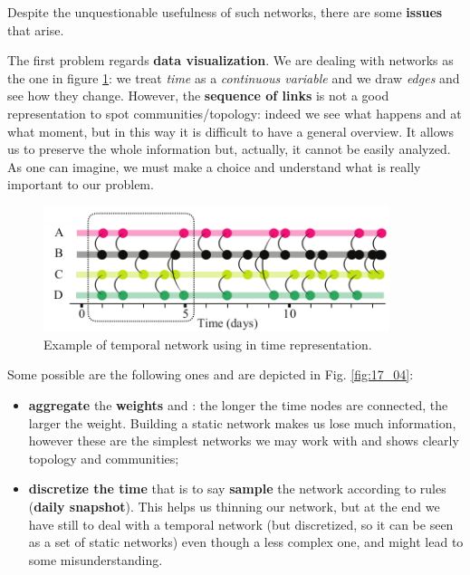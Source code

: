 \documentclass[../main/main.tex]{subfiles}
\begin{document}
Despite the unquestionable usefulness of such networks, there are some \textbf{issues} that arise.

The first problem regards \textbf{data visualization}. We are dealing with networks as the one in figure \ref{fig:17_03}: we treat \textit{time} as a \textit{continuous variable} and we draw \textit{edges} and see how they change. However, the \textbf{sequence of links} is not a good representation to spot communities/topology: indeed we see what happens and at what moment, but in this way it is difficult to have a general overview. It allows us to preserve the whole information but, actually, it cannot be easily analyzed. As one can imagine, we must make a choice and understand what is really important to our problem.


\begin{figure}[h!]
\centering
\includegraphics[width=0.9\textwidth]{../lessons/image/17/image03.png}
\caption{\label{fig:17_03} Example of temporal network using  in time representation.}
\end{figure}


Some possible  are the following ones and are depicted in Fig. \ref{fig:17_04}:
\begin{itemize}
    \item \textbf{aggregate} the \textbf{weights} and : the longer the time nodes are connected, the larger the weight. Building a static network makes us lose much information, however these are the simplest networks we may work with and shows clearly topology and communities;
    \item \textbf{discretize the time} that is to say \textbf{sample} the network according to rules (\textbf{daily snapshot}). This helps us thinning our network, but at the end we have still to deal with a temporal network (but discretized, so it can be seen as a set of static networks) even though a less complex one, and might lead to some misunderstanding.
\end{itemize}
\end{document}
